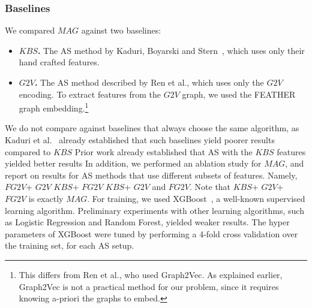 \documentclass[letterpaper]{article} %
\newcommand{\shortcite}[1]{\cite{#1}}
\newcommand{\gtv}[1]{\ensuremath{\textit{G2V}}\xspace}
\newcommand{\fgtv}[1]{\ensuremath{\textit{FG2V}}\xspace}
\newcommand{\kaduri}[1]{\ensuremath{\textit{KBS}}\xspace}
\newcommand{\mapfgas}[1]{\ensuremath{\textit{MAG}}\xspace}
\begin{document}
\subsubsection{Baselines}
We compared \mapfgas\ against two baselines:
\begin{itemize}
    \item \textbf{\kaduri\ .} The AS method by Kaduri, Boyarski and Stern~\cite{kaduri2020algorithm}, which uses only their hand crafted features.
    \item \textbf{\gtv\ .} The AS method described by Ren et al.\cite{ren2021mapfast}, which uses only the \gtv\ encoding. To extract features from the \gtv\ graph, we used the FEATHER graph embedding.\footnote{This differs from Ren et al., who used Graph2Vec. As explained earlier, Graph2Vec is not a practical method for our problem, since it requires knowing a-priori the graphs to embed.}
\end{itemize}
We do not compare against baselines that always choose the same algorithm, as Kaduri et al.~\shortcite{stern2019multi} already established that such baselines yield poorer results compared to \kaduri.
Prior work already established that AS with the \kaduri\ features yielded better results
In addition, we performed an ablation study for \mapfgas\ , and report on results for AS methods that use different subsets of features. Namely, \fgtv\ + \gtv\,
\kaduri\ + \fgtv\,
\kaduri\ + \gtv\,
and \fgtv\ .
Note that \kaduri\ + \gtv\ + \fgtv\ is exactly \mapfgas\ .
For training, we used XGBoost~\cite{chen2016xgboost}, a well-known supervised learning algorithm.
Preliminary experiments with other learning algorithms, such as Logistic Regression and Random Forest, yielded weaker results. %
The hyper parameters of XGBoost were tuned by performing a  4-fold cross validation over the training set, for each AS setup.
\end{document}
